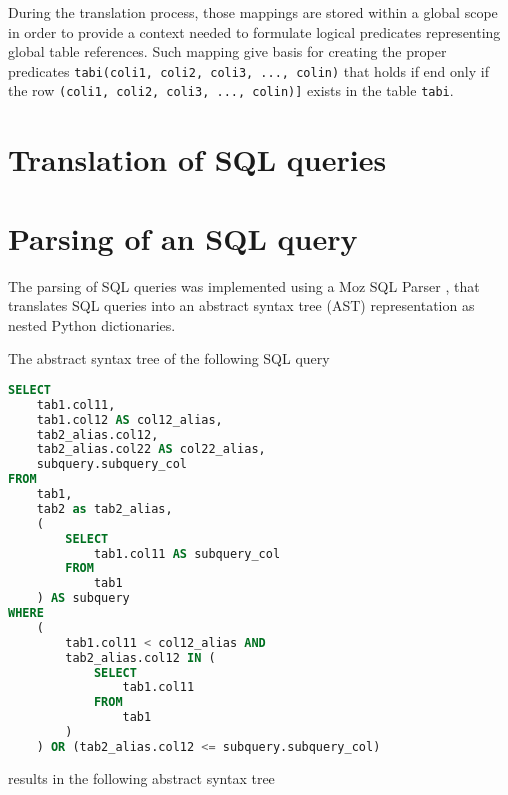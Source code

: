 \documentclass[magisterska,en]{pracamgr}
\newcommand{\code}[1]{\texttt{#1}}
\begin{document}
During the translation process, those mappings are stored within a global scope in order to provide a context needed to formulate logical predicates representing global table references. Such mapping give basis for creating the proper predicates \code{tabi(coli1, coli2, coli3, ..., colin)} that holds if end only if the row \code{(coli1, coli2, coli3, ..., colin)]} exists in the table \code{tabi}.

\section{Translation of SQL queries}

\section{Parsing of an SQL query}
The parsing of SQL queries was implemented using a Moz SQL Parser \cite{mozsqlparser}, that translates SQL queries into an abstract syntax tree (AST) representation as nested Python dictionaries.



The abstract syntax tree of the following SQL query
\begin{lstlisting}[language=SQL, caption=Sample \code{SELECT} statement]
SELECT
    tab1.col11,
    tab1.col12 AS col12_alias,
    tab2_alias.col12,
    tab2_alias.col22 AS col22_alias,
    subquery.subquery_col
FROM
    tab1,
    tab2 as tab2_alias,
    (
        SELECT
            tab1.col11 AS subquery_col
        FROM
            tab1
    ) AS subquery
WHERE
    (
        tab1.col11 < col12_alias AND
        tab2_alias.col12 IN (
            SELECT
                tab1.col11
            FROM
                tab1
        )
    ) OR (tab2_alias.col12 <= subquery.subquery_col)
\end{lstlisting}
results in the following abstract syntax tree
\end{document}
